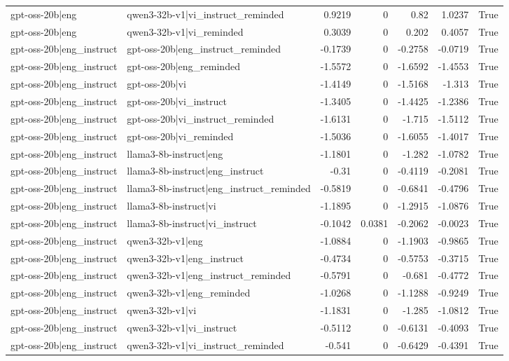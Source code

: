 \begin{table}
\begin{tabular}{l l r r r r l}
gpt-oss-20b|eng & qwen3-32b-v1|vi_instruct_reminded & 0.9219 & 0 & 0.82 & 1.0237 & True \\
gpt-oss-20b|eng & qwen3-32b-v1|vi_reminded & 0.3039 & 0 & 0.202 & 0.4057 & True \\
gpt-oss-20b|eng_instruct & gpt-oss-20b|eng_instruct_reminded & -0.1739 & 0 & -0.2758 & -0.0719 & True \\
gpt-oss-20b|eng_instruct & gpt-oss-20b|eng_reminded & -1.5572 & 0 & -1.6592 & -1.4553 & True \\
gpt-oss-20b|eng_instruct & gpt-oss-20b|vi & -1.4149 & 0 & -1.5168 & -1.313 & True \\
gpt-oss-20b|eng_instruct & gpt-oss-20b|vi_instruct & -1.3405 & 0 & -1.4425 & -1.2386 & True \\
gpt-oss-20b|eng_instruct & gpt-oss-20b|vi_instruct_reminded & -1.6131 & 0 & -1.715 & -1.5112 & True \\
gpt-oss-20b|eng_instruct & gpt-oss-20b|vi_reminded & -1.5036 & 0 & -1.6055 & -1.4017 & True \\
gpt-oss-20b|eng_instruct & llama3-8b-instruct|eng & -1.1801 & 0 & -1.282 & -1.0782 & True \\
gpt-oss-20b|eng_instruct & llama3-8b-instruct|eng_instruct & -0.31 & 0 & -0.4119 & -0.2081 & True \\
gpt-oss-20b|eng_instruct & llama3-8b-instruct|eng_instruct_reminded & -0.5819 & 0 & -0.6841 & -0.4796 & True \\
gpt-oss-20b|eng_instruct & llama3-8b-instruct|vi & -1.1895 & 0 & -1.2915 & -1.0876 & True \\
gpt-oss-20b|eng_instruct & llama3-8b-instruct|vi_instruct & -0.1042 & 0.0381 & -0.2062 & -0.0023 & True \\
gpt-oss-20b|eng_instruct & qwen3-32b-v1|eng & -1.0884 & 0 & -1.1903 & -0.9865 & True \\
gpt-oss-20b|eng_instruct & qwen3-32b-v1|eng_instruct & -0.4734 & 0 & -0.5753 & -0.3715 & True \\
gpt-oss-20b|eng_instruct & qwen3-32b-v1|eng_instruct_reminded & -0.5791 & 0 & -0.681 & -0.4772 & True \\
gpt-oss-20b|eng_instruct & qwen3-32b-v1|eng_reminded & -1.0268 & 0 & -1.1288 & -0.9249 & True \\
gpt-oss-20b|eng_instruct & qwen3-32b-v1|vi & -1.1831 & 0 & -1.285 & -1.0812 & True \\
gpt-oss-20b|eng_instruct & qwen3-32b-v1|vi_instruct & -0.5112 & 0 & -0.6131 & -0.4093 & True \\
gpt-oss-20b|eng_instruct & qwen3-32b-v1|vi_instruct_reminded & -0.541 & 0 & -0.6429 & -0.4391 & True \\

\end{tabular}
\end{table}
